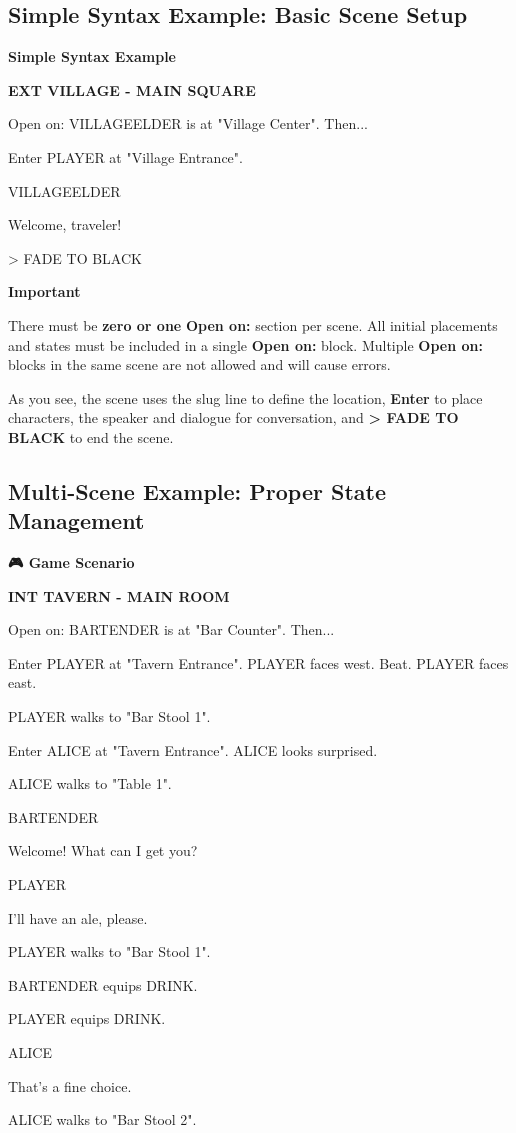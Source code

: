 \documentclass[11pt,letterpaper,oldstylefigures]{memoir}
\newcommand{\slugline}[1]{\nobreak\textbf{\MakeUppercase{#1}}\par\nobreak\vspace{1\baselineskip}}
\newcommand{\speaker}[1]{\nobreak\hspace*{0.333\textwidth}\MakeUppercase{#1}\par\nobreak\vspace{0.5\baselineskip}}
\newcommand{\dialogue}[1]{\nobreak\hspace*{0.25\textwidth}\begin{minipage}{0.5\textwidth}#1\end{minipage}\par\vspace{1\baselineskip}}
\newcommand{\stagedir}[1]{#1\par\vspace{1\baselineskip}}
\newenvironment{FountainExample}
  {\begingroup
  \ttfamily\small
   \setlength{\parindent}{0pt}
  \setlength{\parskip}{0.5em}
  \allowdisplaybreaks
  \setlength{\displaywidowpenalty}{0}
  \setlength{\widowpenalty}{0}
  \setlength{\clubpenalty}{0}
  \setlength{\interlinepenalty}{0}
}
  {\endgroup}
\newcommand{\sceneendcmd}[1]{\begin{flushright}\ttfamily #1\end{flushright}}
\newenvironment{SimpleExample}
{\begingroup
\small
\setlength{\parindent}{0pt}
\setlength{\parskip}{0.5em}
\allowdisplaybreaks
\setlength{\displaywidowpenalty}{0}
\setlength{\widowpenalty}{0}
\setlength{\clubpenalty}{0}
\setlength{\interlinepenalty}{0}
\begin{tcolorbox}[
    colback=blue!5,
    colframe=blue!75!black,
    boxrule=0.5pt,
    arc=2pt,
    left=0.5em,
    right=0.5em,
    top=0.25em,
    bottom=0.25em
]
\textbf{Simple Syntax Example}
\end{tcolorbox}\par
}
{\endgroup}
\newenvironment{GameScenario}
{\begingroup
\small
\setlength{\parindent}{0pt}
\setlength{\parskip}{0.5em}
\allowdisplaybreaks
\setlength{\displaywidowpenalty}{0}
\setlength{\widowpenalty}{0}
\setlength{\clubpenalty}{0}
\setlength{\interlinepenalty}{0}
\begin{tcolorbox}[
    colback=orange!5,
    colframe=orange!75!black,
    boxrule=0.5pt,
    arc=2pt,
    left=0.5em,
    right=0.5em,
    top=0.25em,
    bottom=0.25em
]
\textbf{🎮 Game Scenario}
\end{tcolorbox}\par
}
{\endgroup}
\newenvironment{Important}
{\begingroup
\small
\setlength{\parindent}{0pt}
\setlength{\parskip}{0.5em}
\allowdisplaybreaks
\setlength{\displaywidowpenalty}{0}
\setlength{\widowpenalty}{0}
\setlength{\clubpenalty}{0}
\setlength{\interlinepenalty}{0}
\begin{tcolorbox}[
    colback=yellow!5,
    colframe=yellow!75!black,
    boxrule=0.5pt,
    arc=2pt,
    left=0.5em,
    right=0.5em,
    top=0.25em,
    bottom=0.25em
]
\textbf{Important}
\end{tcolorbox}\par
}
{\endgroup}
\newcommand{\fountain}[1]{\textbf{#1}}
\begin{document}
\subsection{Simple Syntax Example: Basic Scene Setup}

\begin{SimpleExample}
\begin{FountainExample}
\slugline{EXT VILLAGE - MAIN SQUARE}

\stagedir{Open on: VILLAGEELDER is at "Village Center". Then...}
\stagedir{Enter PLAYER at "Village Entrance".}

\speaker{VILLAGEELDER}
\dialogue{Welcome, traveler!}

\sceneendcmd{> FADE TO BLACK}
\end{FountainExample}
\end{SimpleExample}

\begin{Important}
There must be \textbf{zero or one} \fountain{Open on:} section per scene. All initial placements and states must be included in a single \fountain{Open on:} block. Multiple \fountain{Open on:} blocks in the same scene are not allowed and will cause errors.
\end{Important}

As you see, the scene uses the slug line to define the location, \fountain{Enter} to place characters,
the speaker and dialogue  for conversation, and \fountain{> FADE TO BLACK } to end the scene.

\subsection{Multi-Scene Example: Proper State Management}

\begin{GameScenario}
\begin{FountainExample}
\slugline{INT TAVERN - MAIN ROOM}

\stagedir{Open on: BARTENDER is at "Bar Counter". Then...}
\stagedir{Enter PLAYER at "Tavern Entrance". PLAYER faces west. Beat. PLAYER faces east.}
\stagedir{PLAYER walks to "Bar Stool 1".}
\stagedir{Enter ALICE at "Tavern Entrance". ALICE looks surprised.}
\stagedir{ALICE walks to "Table 1".}

\speaker{BARTENDER}
\dialogue{Welcome! What can I get you?}

\speaker{PLAYER}
\dialogue{I'll have an ale, please.}

\stagedir{PLAYER walks to "Bar Stool 1".}
\stagedir{BARTENDER equips DRINK.}
\stagedir{PLAYER equips DRINK.}

\speaker{ALICE}
\dialogue{That's a fine choice.}

\stagedir{ALICE walks to "Bar Stool 2".}
\end{FountainExample}
\end{GameScenario}
\end{document}
